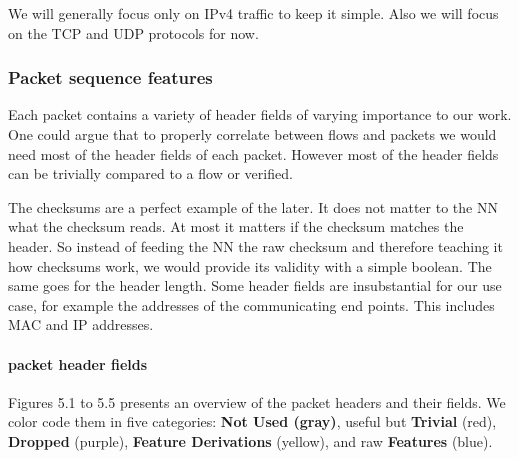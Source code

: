 \documentclass[
	ngerman,
	ruledheaders=section,%
	class=report,%
	thesis={type=bachelor},%
	accentcolor=9c,%
	custommargins=true,%
	marginpar=false,%
	parskip=half-,%
	fontsize=11pt,%
]{tudapub}
\begin{document}
We will generally focus only on IPv4 traffic to keep it simple.
Also we will focus on the TCP and UDP protocols for now.


\subsubsection{Packet sequence features}


Each packet contains a variety of header fields of varying importance to our work.
One could argue that to properly correlate between flows and packets we would need most of the header fields of each packet.
However most of the header fields can be trivially compared to a flow or verified.

The checksums are a perfect example of the later.
It does not matter to the NN what the checksum reads.
At most it matters if the checksum matches the header.
So instead of feeding the NN the raw checksum and therefore teaching it how checksums work, we would provide its validity with a simple boolean.
The same goes for the header length.
Some header fields are insubstantial for our use case, for example the addresses of the communicating end points.
This includes MAC and IP addresses.

\paragraph{packet header fields}
Figures 5.1 to 5.5 presents an overview of the packet headers and their fields.
We color code them in five categories:
\colorbox{not}{\textbf{{Not Used} (gray)}},
useful but \colorbox{trivial}{\textbf{Trivial} (red)},
\colorbox{dropped}{\textbf{Dropped} (purple)},
\colorbox{derivation}{\textbf{Feature Derivations} (yellow)},
and raw \colorbox{feature}{\textbf{Features} (blue)}.
\end{document}
